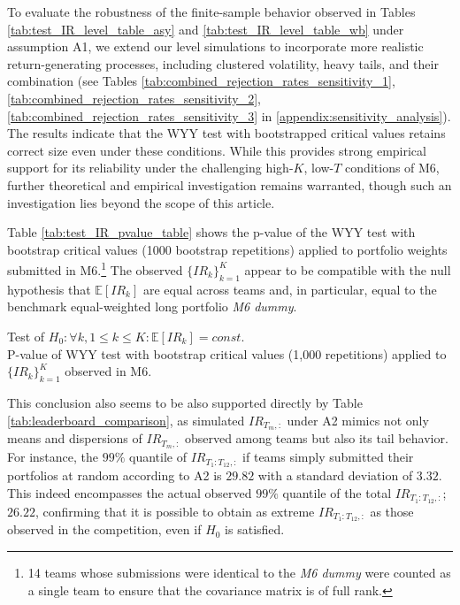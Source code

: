 \documentclass[3p,times,twocolumn]{elsarticle}
\begin{document}
To evaluate the robustness of the finite-sample behavior observed in Tables \ref{tab:test_IR_level_table_asy} and \ref{tab:test_IR_level_table_wb} under assumption A1, we extend our level simulations to incorporate more realistic return-generating processes, including clustered volatility, heavy tails, and their combination (see Tables \ref{tab:combined_rejection_rates_sensitivity_1}, \ref{tab:combined_rejection_rates_sensitivity_2}, \ref{tab:combined_rejection_rates_sensitivity_3} in \ref{appendix:sensitivity_analysis}). 
The results indicate that the WYY test with bootstrapped critical values retains correct size even under these conditions. 
While this provides strong empirical support for its reliability under the challenging high-$K$, low-$T$ conditions of M6, further theoretical and empirical investigation remains warranted, though such an investigation lies beyond the scope of this article.

Table \ref{tab:test_IR_pvalue_table} shows the p-value of the WYY test with bootstrap critical values (1000 bootstrap repetitions) applied to portfolio weights submitted in M6.\footnote{
    14 teams whose submissions were identical to the \emph{M6 dummy} were counted as a single team to ensure that the covariance matrix is of full rank.
} %
The observed $\{IR_{k}\}_{k=1}^{K}$ appear to be compatible with the null hypothesis that $\mathbb{E}[IR_{k}]$ are equal across teams and, in particular, equal to the benchmark equal-weighted long portfolio \emph{M6 dummy}.

\begin{table}[!htbp]
    \fontsize{5}{5}\selectfont
    \centering
    \caption{Test of $H_{0}:\forall k, 1\leq k\leq K: \mathbb{E}[IR_{k}]=const.$\\
        P-value of WYY test with bootstrap critical values (1,000 repetitions) applied to $\{IR_{k}\}_{k=1}^{K}$ observed in M6.
    }
    \label{tab:test_IR_pvalue_table}
\end{table}

This conclusion also seems to be also supported directly by Table \ref{tab:leaderboard_comparison}, as simulated $IR_{T_{m},:}$ under A2 mimics not only means and dispersions of $IR_{T_{m},:}$ observed among teams but also its tail behavior.
For instance, the $99\%$ quantile of $IR_{T_{1}:T_{12},:}$ if teams simply submitted their portfolios at random according to A2 is $29.82$ with a standard deviation of $3.32$.
This indeed encompasses the actual observed $99\%$ quantile of the total $IR_{T_{1}:T_{12},:}$; $26.22$, confirming that it is possible to obtain as extreme $IR_{T_{1}:T_{12},:}$ as those observed in the competition, even if $H_{0}$ is satisfied.
\end{document}
